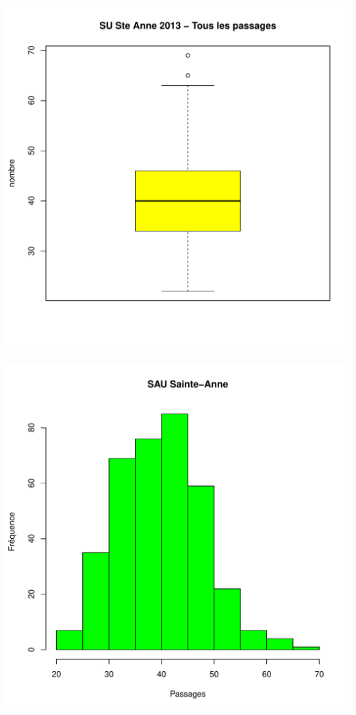 \documentclass[12pt,english,french,twoside]{book}\usepackage[]{graphicx}\usepackage[]{color}
\makeatletter
\def\maxwidth{ %
  \ifdim\Gin@nat@width>\linewidth
    \linewidth
  \else
    \Gin@nat@width
  \fi
}
\makeatother
\begin{document}
\includegraphics[width=\maxwidth]{figure/stAnne_tot_passages1} 

\includegraphics[width=\maxwidth]{figure/stAnne_tot_passages2} 
\end{document}
